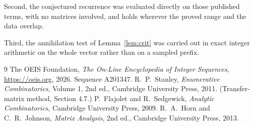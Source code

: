 \documentclass[11pt,a4paper]{article}
\theoremstyle{plain}
\theoremstyle{definition}
\begin{document}
Second, the conjectured recurrence was evaluated directly on those published terms, with no
matrices involved, and holds wherever the proved range and the data overlap.

Third, the annihilation test of Lemma~\ref{lem:crit} was carried out in exact integer
arithmetic on the whole vector rather than on a sampled prefix.

\begin{thebibliography}{9}
 The OEIS Foundation, \emph{The On-Line Encyclopedia of Integer
Sequences}, \url{https://oeis.org}, 2026. Sequence A201347.
 R.~P.~Stanley, \emph{Enumerative Combinatorics}, Volume 1, 2nd ed.,
Cambridge University Press, 2011. (Transfer-matrix method, Section 4.7.)
 P.~Flajolet and R.~Sedgewick, \emph{Analytic Combinatorics}, Cambridge
University Press, 2009.
 R.~A.~Horn and C.~R.~Johnson, \emph{Matrix Analysis}, 2nd ed., Cambridge
University Press, 2013.
\end{thebibliography}
\end{document}
